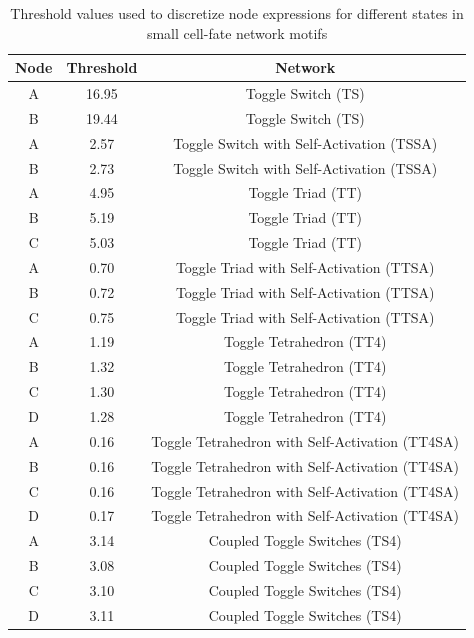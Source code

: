 \documentclass[11pt]{article}
\begin{document}
\begin{table}[!ht]
\centering
\caption{\normalsize{Threshold values used to discretize node expressions for different states in small cell-fate network motifs}}
\label{tb:Thresholds}
\begin{tabular}{|c|c|c|}
    \hline
    \textbf{Node} &  \textbf{Threshold} & \textbf{Network}\\
    \hline\hline
    A & 16.95 & Toggle Switch (TS)\\
    \hline
    B & 19.44 & Toggle Switch (TS)\\
    \hline
    A & 2.57 & Toggle Switch with Self-Activation (TSSA)\\
    \hline
    B & 2.73 & Toggle Switch with Self-Activation (TSSA)\\
    \hline
    A & 4.95 & Toggle Triad (TT)\\
    \hline
    B & 5.19 & Toggle Triad (TT)\\
    \hline
    C & 5.03 & Toggle Triad (TT)\\
    \hline
    A & 0.70 & Toggle Triad with Self-Activation (TTSA)\\
    \hline
    B & 0.72 & Toggle Triad with Self-Activation (TTSA)\\
    \hline
    C & 0.75 & Toggle Triad with Self-Activation (TTSA)\\
    \hline
    A & 1.19 & Toggle Tetrahedron (TT4)\\
    \hline
    B & 1.32 & Toggle Tetrahedron (TT4)\\
    \hline
    C & 1.30 & Toggle Tetrahedron (TT4)\\
    \hline
    D & 1.28 & Toggle Tetrahedron (TT4)\\
    \hline
    A & 0.16 & Toggle Tetrahedron with Self-Activation (TT4SA)\\
    \hline
    B & 0.16 & Toggle Tetrahedron with Self-Activation (TT4SA)\\
    \hline
    C & 0.16 & Toggle Tetrahedron with Self-Activation (TT4SA)\\
    \hline
    D & 0.17 & Toggle Tetrahedron with Self-Activation (TT4SA)\\
    \hline
    A & 3.14 & Coupled Toggle Switches (TS4)\\
    \hline
    B & 3.08 & Coupled Toggle Switches (TS4)\\
    \hline
    C & 3.10 & Coupled Toggle Switches (TS4)\\
    \hline
    D & 3.11 & Coupled Toggle Switches (TS4)\\
    \hline
\end{tabular}
\end{table}
\end{document}
